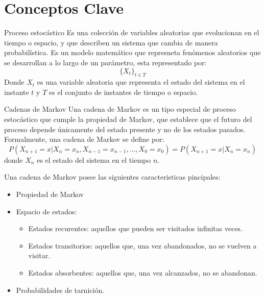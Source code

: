 \documentclass[12pt]{beamer}
\begin{document}
\section{Conceptos Clave}
\begin{frame}
    \begin{block}{Proceso estocástico}
        Es una colección de variables aleatorias que evolucionan en el tiempo o espacio, y que describen un sistema que cambia 
        de manera probabilística. Es un modelo matemático que represneta fenómenos aleatorios que se desarrollan a lo largo de un parámetro,
        esta representado por:
        \[
                \{X_t\}_{t\in T}
        \]
        Donde $X_t$ es una variable aleatoria que representa el estado del sistema en el instante $t$ y $T$ es el conjunto de instantes de tiempo o espacio.
    \end{block}
\end{frame}

\begin{frame}
    \begin{block}{Cadenas de Markov}
        Una cadena de Markov es un tipo especial de proceso estocástico que cumple la propiedad de Markov,
         que establece que el futuro del proceso depende únicamente del estado presente y no de los estados pasados. 
        Formalmente, una cadena de Markov se define por:
        \[
            P(X_{n+1} = x | X_n = x_n, X_{n-1} = x_{n-1}, \ldots, X_0 = x_0) = P(X_{n+1} = x | X_n = x_n)
        \]
        donde $X_n$ es el estado del sistema en el tiempo $n$.
    \end{block}
    Una cadena de Markov posee las siguientes caracteristicas pincipales:
    \begin{itemize}
        \item Propiedad de Markov
        \item Espacio de estados:
        \begin{itemize}
            \item Estados recurentes: aquellos que pueden ser visitados infinitas veces.
            \item Estados transitorios: aquellos que, una vez abandonados, no se vuelven a visitar.
            \item Estados absorbentes: aquellos que, una vez alcanzados, no se abandonan.
        \end{itemize}
        \item Probabilidades de tarnición.
    \end{itemize}
\end{frame}
\end{document}
